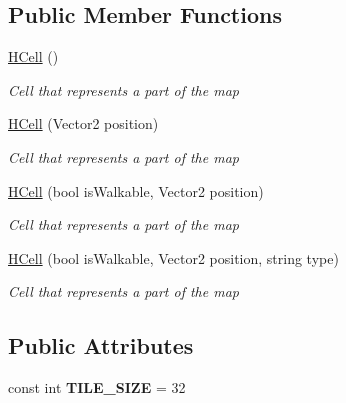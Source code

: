 \subsection*{Public Member Functions}
\begin{DoxyCompactItemize}
\item 
\hyperlink{class_hel_project_1_1_game_world_1_1_map_1_1_h_cell_a668a877ddffe6ff8e1dca674214a9c3d}{H\+Cell} ()
\begin{DoxyCompactList}\small\item\em Cell that represents a part of the map \end{DoxyCompactList}\item 
\hyperlink{class_hel_project_1_1_game_world_1_1_map_1_1_h_cell_a32bbca9e2eadd8aeeb956629418f00f1}{H\+Cell} (Vector2 position)
\begin{DoxyCompactList}\small\item\em Cell that represents a part of the map \end{DoxyCompactList}\item 
\hyperlink{class_hel_project_1_1_game_world_1_1_map_1_1_h_cell_ac17c0998ae60d46ea3b6e1d7ca29e54e}{H\+Cell} (bool is\+Walkable, Vector2 position)
\begin{DoxyCompactList}\small\item\em Cell that represents a part of the map \end{DoxyCompactList}\item 
\hyperlink{class_hel_project_1_1_game_world_1_1_map_1_1_h_cell_a3660e3a5fc19aae5e1188f73330d645b}{H\+Cell} (bool is\+Walkable, Vector2 position, string type)
\begin{DoxyCompactList}\small\item\em Cell that represents a part of the map \end{DoxyCompactList}\end{DoxyCompactItemize}
\subsection*{Public Attributes}
\begin{DoxyCompactItemize}
\item 
\hypertarget{class_hel_project_1_1_game_world_1_1_map_1_1_h_cell_ae39c780d2536601254122162487f8a79}{}const int {\bfseries T\+I\+L\+E\+\_\+\+S\+I\+Z\+E} = 32\label{class_hel_project_1_1_game_world_1_1_map_1_1_h_cell_ae39c780d2536601254122162487f8a79}

\end{DoxyCompactItemize}
